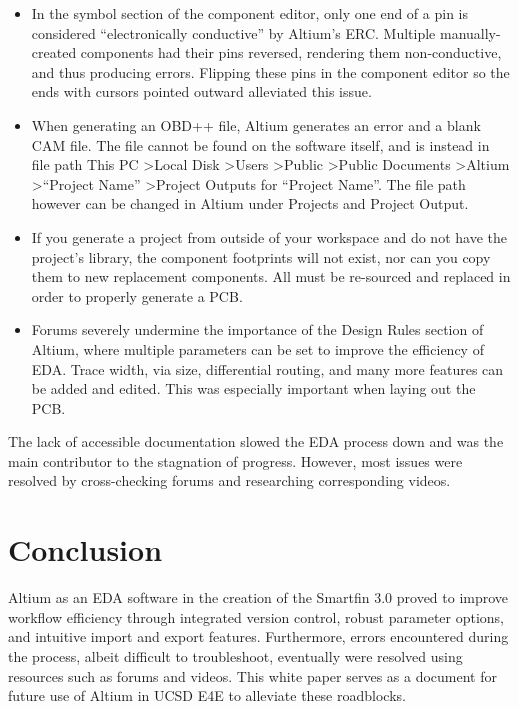 \documentclass[twocolumn]{article}
\begin{document}
\begin{itemize} 
\item {In the symbol section of the component editor, only one end of a pin is considered “electronically conductive” by Altium’s ERC. Multiple manually-created components had their pins reversed, rendering them non-conductive, and thus producing errors. Flipping these pins in the component editor so the ends with cursors pointed outward alleviated this issue.}
 
\item {When generating an OBD++ file, Altium generates an error and a blank CAM file. The file cannot be found on the software itself, and is instead in file path This PC \textgreater Local Disk \textgreater Users \textgreater Public \textgreater Public Documents \textgreater Altium \textgreater “Project Name” \textgreater Project Outputs for “Project Name”. The file path however can be changed in Altium under Projects and Project Output.}

\item {If you generate a project from outside of your workspace and do not have the project’s library, the component footprints will not exist, nor can you copy them to new replacement components. All must be re-sourced and replaced in order to properly generate a PCB.}

\item {Forums severely undermine the importance of the Design Rules section of Altium, where multiple parameters can be set to improve the efficiency of EDA. Trace width, via size, differential routing, and many more features can be added and edited. This was especially important when laying out the PCB.}

\end{itemize}

The lack of accessible documentation slowed the EDA process down and was the main contributor to the stagnation of progress. However, most issues were resolved by cross-checking forums and researching corresponding videos. 


\section{Conclusion}

Altium as an EDA software in the creation of the Smartfin 3.0 proved to improve workflow efficiency through integrated version control, robust parameter options, and intuitive import and export features. Furthermore, errors encountered during the process, albeit difficult to troubleshoot, eventually were resolved using resources such as forums and videos. This white paper serves as a document for future use of Altium in UCSD E4E to alleviate these roadblocks.

\printbibliography
\end{document}
